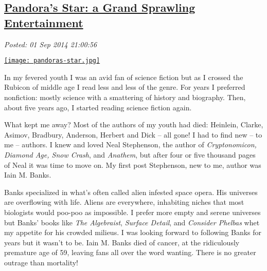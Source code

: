 %

\subsection*{\href{http://bakerjd99.wordpress.com/2014/09/01/pandoras-star-a-grand-sprawling-entertainment/}{Pandora's Star: a Grand Sprawling Entertainment}}


\noindent\emph{Posted: 01 Sep 2014 21:00:56}
\vspace{6pt}


\captionsetup[floatingfigure]{labelformat=empty}
\begin{floatingfigure}[l]{0.24\textwidth}
\centering
\href{http://www.barnesandnoble.com/w/pandoras-star-peter-f-hamilton/1100293432?ean=9780345479211}{\texttt{[image: pandoras-star.jpg]}}
\label{fig:4817X0}
\end{floatingfigure} In
my fevered youth I was an avid fan of science fiction but as I crossed
the Rubicon of middle age I read less and less of the genre. For years I
preferred nonfiction: mostly science with a smattering of history and
biography. Then, about five years ago, I started reading science fiction
again.

What kept me away? Most of the authors of my youth had died: Heinlein,
Clarke, Asimov, Bradbury, Anderson, Herbert and Dick -- all gone! I had
to find new -- to me -- authors. I knew and loved Neal Stephenson, the
author of \emph{Cryptonomicon, Diamond Age, Snow Crash}, and
\emph{Anathem}, but after four or five thousand pages of Neal it was
time to move on. My first post Stephenson, new to me, author was Iain M.
Banks.

Banks specialized in what's often called alien infested space opera. His
universes are overflowing with life. Aliens are everywhere, inhabiting
niches that most biologists would poo-poo as impossible. I prefer more
empty and serene universes but Banks' books like \emph{The Algebraist},
\emph{Surface Detail}, and \emph{Consider Phelbas} whet my appetite for
his crowded milieus. I was looking forward to following Banks for years
but it wasn't to be. Iain M. Banks died of cancer, at the ridiculously
premature age of 59, leaving fans all over the word wanting. There is no
greater outrage than mortality!

